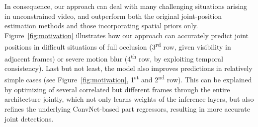 \documentclass[10pt,twocolumn,letterpaper]{article}
\newcommand{\figref}[1]{Figure~\ref{#1}}
\begin{document}
In consequence, our approach can deal with many challenging situations arising in unconstrained video, and outperform both the original joint-position estimation methods and those incorporating spatial priors only. \figref{fig:motivation}  illustrates how our approach can accurately predict joint positions in difficult situations of full occlusion (3\textsuperscript{rd} row, given visibility in adjacent frames) or severe motion blur (4\textsuperscript{th} row, by exploiting temporal consistency). Last but not least, the model also improves predictions in relatively simple cases (see \figref{fig:motivation}, 1\textsuperscript{st} and 2\textsuperscript{nd} row). This can be explained by optimizing of several correlated but different frames through the entire architecture jointly, which not only learns weights of the inference layers, but also refines the underlying ConvNet-based part regressors, resulting in more accurate joint detections.

\end{document}
